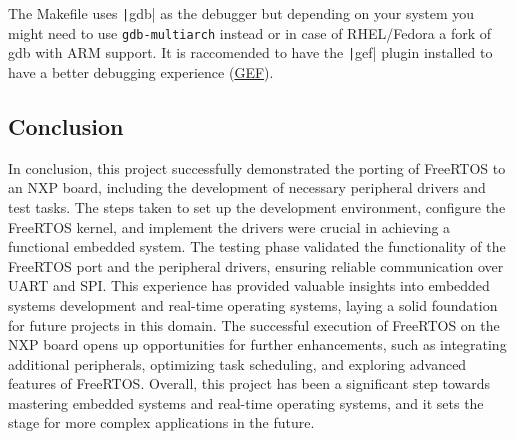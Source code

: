 The Makefile uses \texttt|gdb| as the debugger but depending on your system you might need to use \texttt{gdb-multiarch} instead or in case of RHEL/Fedora a fork of gdb with ARM support. 
It is raccomended to have the \texttt|gef| plugin installed to have a better debugging experience (\href{https://github.com/hugsy/gef}{GEF}).

\subsection{Conclusion}
In conclusion, this project successfully demonstrated the porting of FreeRTOS to an NXP board, including the development of necessary peripheral drivers and test tasks. The steps taken to set up the development environment, configure the FreeRTOS kernel, and implement the drivers were crucial in achieving a functional embedded system. The testing phase validated the functionality of the FreeRTOS port and the peripheral drivers, ensuring reliable communication over UART and SPI. This experience has provided valuable insights into embedded systems development and real-time operating systems, laying a solid foundation for future projects in this domain. The successful execution of FreeRTOS on the NXP board opens up opportunities for further enhancements, such as integrating additional peripherals, optimizing task scheduling, and exploring advanced features of FreeRTOS. Overall, this project has been a significant step towards mastering embedded systems and real-time operating systems, and it sets the stage for more complex applications in the future.
